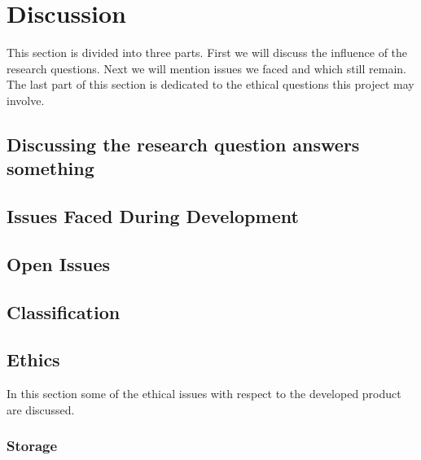 \chapter{Discussion}

This section is divided into three parts. First we will discuss the influence of the research questions. Next we will mention issues we faced and which still remain. The last part of this section is dedicated to the ethical questions this project may involve.

\section{Discussing the research question answers something} 

\section{Issues Faced During Development}
    


\section{Open Issues}

\section{Classification}

\section{Ethics}
In this section some of the ethical issues with respect to the developed product are discussed. 

\subsection{Storage}

